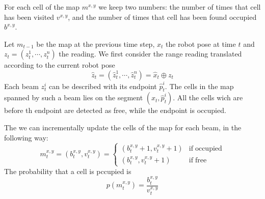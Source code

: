 \documentclass[a4paper]{article}
\begin{document}
For each cell of the map $m^{x,y}$ we keep two numbers: the number of times that cell has been visited $v^{x,y}$, and the number of times that cell has been found occupied $b^{x,y}$.

Let $m_{t-1}$ be the map at the previous time step, $x_t$ the robot pose at time $t$ and $z_t=(z^1_t,\cdots,z^n_t)$ the reading.
We first consider the range reading translated according to the current robot pose
\begin{equation}
\hat z_t=(\hat z^1_t,\cdots, \hat z^n_t)=\hat x_t \oplus z_t
\end{equation}
Each beam $z^i_t$ can be described with its endpoint $\hat p^i_t$.
The cells in the map spanned by such a beam lies on the segment $(\hat x_t, \hat p^i_t)$. All the cells wich are before th endpoint are detected as free, while the endpoint is occupied.

The we can incrementally update the cells of the map for each beam, in the following way:
\begin{equation}
m^{x,y}_t=(b^{x,y}_t,v^{x,y}_t)=
\left\{
\begin{array}{cc}
(b^{x,y}_t+1,v^{x,y}_t+1) & \mathrm{if\;occupied}\\
(b^{x,y}_t,v^{x,y}_t+1) & \mathrm{if\;free}
\end{array}
\right.
\end{equation}
The probability that a cell is pccupied is
\begin{equation}
p(m^{x,y}_t)=\frac{b^{x,y}_t}{v^{x,y}_t}
\end{equation}

\newpage
\end{document}
